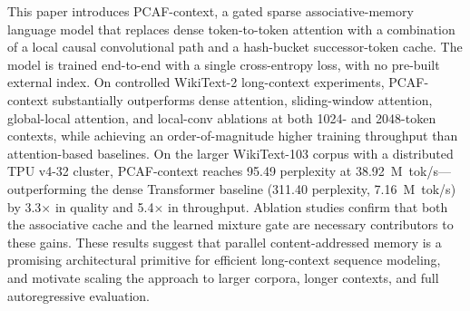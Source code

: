 \documentclass{article}
\begin{document}
This paper introduces PCAF-context, a gated sparse associative-memory language
model that replaces dense token-to-token attention with a combination of a
local causal convolutional path and a hash-bucket successor-token cache. The
model is trained end-to-end with a single cross-entropy loss, with no
pre-built external index. On controlled WikiText-2 long-context experiments,
PCAF-context substantially outperforms dense attention, sliding-window
attention, global-local attention, and local-conv ablations at both 1024- and
2048-token contexts, while achieving an order-of-magnitude higher training
throughput than attention-based baselines. On the larger WikiText-103 corpus
with a distributed TPU v4-32 cluster, PCAF-context reaches 95.49 perplexity at
38.92~M~tok/s---outperforming the dense Transformer baseline (311.40 perplexity,
7.16~M~tok/s) by 3.3$\times$ in quality and 5.4$\times$ in throughput.
Ablation studies confirm that both the associative cache and the learned mixture
gate are necessary contributors to these gains. These results suggest that
parallel content-addressed memory is a promising architectural primitive for
efficient long-context sequence modeling, and motivate scaling the approach to
larger corpora, longer contexts, and full autoregressive evaluation.



\end{document}
